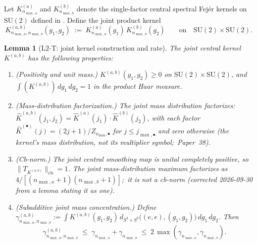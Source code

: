 \documentclass[11pt,a4paper]{article}
\theoremstyle{plain}
\newtheorem{lemma}[theorem]{Lemma}
\theoremstyle{definition}
\newcommand{\nmax}{n_{\max}}
\newcommand{\nmaxa}{n_{\max,a}}
\newcommand{\nmaxb}{n_{\max,b}}
\newcommand{\sthree}{S^{3}}
\newcommand{\cbnorm}[1]{\lVert #1 \rVert_{\mathrm{cb}}}
\newcommand{\SU}{\mathrm{SU}}
\newcommand{\KS}{K}
\begin{document}
Let $\KS^{(a)}_{\nmaxa}$ and $\KS^{(b)}_{\nmaxb}$ denote the
single-factor central spectral Fej\'er kernels on $\SU(2)$ defined in
\cite[Definition~3.3]{loutey_paper38}. Define the joint product kernel
\begin{equation}\label{eq:joint_kernel}
   \KS^{(a,b)}_{\nmaxa, \nmaxb}(g_1, g_2)
   \;:=\; \KS^{(a)}_{\nmaxa}(g_1)\, \KS^{(b)}_{\nmaxb}(g_2)
   \qquad\text{on}\quad \SU(2) \times \SU(2).
\end{equation}

\begin{lemma}[L2-T: joint kernel construction and rate]\label{lem:L2-T}
The joint central kernel $\KS^{(a,b)}$ has the following properties:
\begin{enumerate}\setlength{\itemsep}{2pt}
\item[(a)] (Positivity and unit mass.)
$\KS^{(a,b)}(g_1, g_2) \ge 0$ on $\SU(2) \times \SU(2)$, and
$\int (\KS^{(a,b)})\,dg_1\,dg_2 = 1$ in the product Haar measure.
\item[(b)] (Mass-distribution factorization.) The joint mass
distribution factorizes:
$\widehat{\KS}^{(a,b)}(j_1, j_2) = \widehat{\KS}^{(a)}(j_1) \cdot
\widehat{\KS}^{(b)}(j_2)$, with each factor
$\widehat{\KS}^{(\bullet)}(j) = (2j+1)/Z_{\nmax,\bullet}$ for
$j \le j_{\max,\bullet}$ and zero otherwise (the kernel's mass
distribution, not its multiplier symbol;\ Paper~38).
\item[(c)] (Cb-norm.) The joint central smoothing map is unital
completely positive, so $\cbnorm{T_{\KS^{(a,b)}}} = 1$.  The joint
mass-distribution maximum factorizes as
$4 / [(\nmaxa + 1)(\nmaxb + 1)]$;\ it is not a cb-norm (corrected
2026-09-30 from a lemma stating it as one).
\item[(d)] (Subadditive joint mass concentration.) Define
$\gamma^{(a,b)}_{\nmaxa, \nmaxb} := \int \KS^{(a,b)}(g_1, g_2)\,
d_{\sthree \times \sthree}\bigl((e,e), (g_1, g_2)\bigr)\,dg_1\,dg_2$.
Then
\begin{equation}\label{eq:gamma_joint_subadditive}
   \gamma^{(a,b)}_{\nmaxa, \nmaxb}
   \;\le\; \gamma_{\nmaxa} + \gamma_{\nmaxb}
   \;\le\; 2\,\max(\gamma_{\nmaxa}, \gamma_{\nmaxb}).
\end{equation}
\end{enumerate}
\end{lemma}
\end{document}
